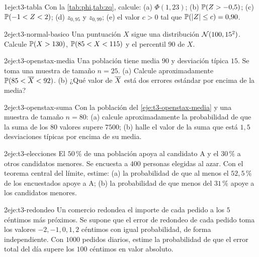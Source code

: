 \begin{ejercicio}{1}{eje:t3-tabla}
Con la \cref{tab:phi,tab:zq}, calcule: (a) $\Phi(1{,}23)$; (b) $\mathbb{P}(Z>-0{,}5)$; (c) $\mathbb{P}(-1<Z<2)$; (d) $z_{0{,}95}$ y $z_{0{,}99}$; (e) el valor $c>0$ tal que $\mathbb{P}(\lvert Z\rvert\le c)=0{,}90$.
\end{ejercicio}

\begin{ejercicio}{2}{eje:t3-normal-basico}
Una puntuación $X$ sigue una distribución $\mathcal{N}(100,15^{2})$. Calcule $\mathbb{P}(X>130)$, $\mathbb{P}(85<X<115)$ y el percentil $90$ de $X$.
\end{ejercicio}

\begin{ejercicio}{2}{eje:t3-openstax-media}
Una población tiene media $90$ y desviación típica $15$. Se toma una muestra de tamaño $n=25$. (a) Calcule aproximadamente $\mathbb{P}(85<\overline{X}<92)$. (b) ¿Qué valor de $\overline{X}$ está dos errores estándar por encima de la media?
\end{ejercicio}

\begin{ejercicio}{2}{eje:t3-openstax-suma}
Con la población del \cref{eje:t3-openstax-media} y una muestra de tamaño $n=80$: (a) calcule aproximadamente la probabilidad de que la suma de los $80$ valores supere $7500$; (b) halle el valor de la suma que está $1{,}5$ desviaciones típicas por encima de su media.
\end{ejercicio}

\begin{ejercicio}{2}{eje:t3-elecciones}
El $50\,\%$ de una población apoya al candidato A y el $30\,\%$ a otros candidatos menores. Se encuesta a $400$ personas elegidas al azar. Con el teorema central del límite, estime: (a) la probabilidad de que al menos el $52{,}5\,\%$ de los encuestados apoye a A; (b) la probabilidad de que menos del $31\,\%$ apoye a los candidatos menores.
\end{ejercicio}

\begin{ejercicio}{2}{eje:t3-redondeo}
Un comercio redondea el importe de cada pedido a los $5$ céntimos más próximos. Se supone que el error de redondeo de cada pedido toma los valores $-2,-1,0,1,2$ céntimos con igual probabilidad, de forma independiente. Con $1000$ pedidos diarios, estime la probabilidad de que el error total del día supere los $100$ céntimos en valor absoluto.
\end{ejercicio}

